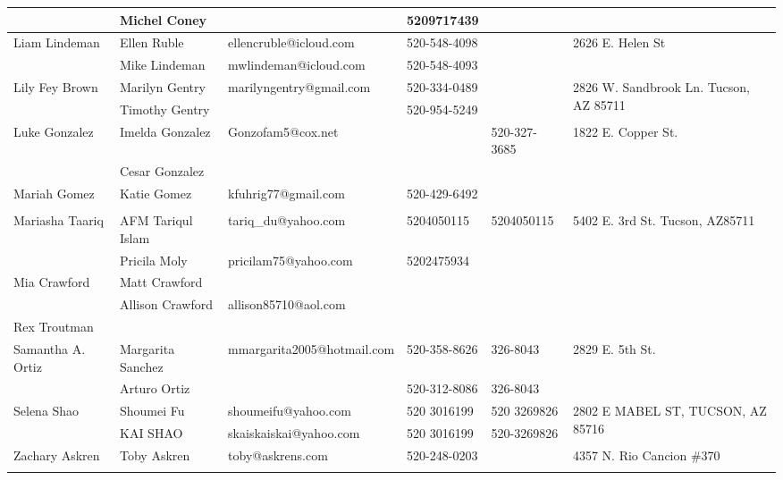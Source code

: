 \documentclass[landscape]{article}\usepackage[]{graphicx}\usepackage[]{color}
\begin{document}
\begin{longtable}{|p{100pt}|p{100pt}|p{140pt}|p{60pt}|p{64pt}|p{120pt}|}
 & Michel Coney &  & 5209717439 &  & \\
\hline
\multirow{2}{100pt}{Liam Lindeman} & Ellen Ruble & ellencruble@icloud.com & 520-548-4098 &  & \multirow{2}{120pt}{2626 E. Helen St} \\
 & Mike Lindeman & mwlindeman@icloud.com & 520-548-4093 &  & \\
\hline
\multirow{2}{100pt}{Lily Fey Brown} & Marilyn Gentry & marilyngentry@gmail.com & 520-334-0489 &  & \multirow{2}{120pt}{2826 W. Sandbrook Ln. Tucson, AZ 85711} \\
 & Timothy Gentry &  & 520-954-5249 &  & \\
\hline
\multirow{2}{100pt}{Luke Gonzalez} & Imelda Gonzalez  & Gonzofam5@cox.net &  & 520-327-3685 & \multirow{2}{120pt}{1822 E. Copper St.} \\
 & Cesar Gonzalez  &  &  &  & \\
\hline
\multirow{2}{100pt}{Mariah Gomez} & Katie Gomez & kfuhrig77@gmail.com & 520-429-6492 &  & \multirow{2}{120pt}{} \\
 &  &  &  &  & \\
\hline
\multirow{2}{100pt}{Mariasha Taariq} & AFM Tariqul Islam & tariq\_du@yahoo.com & 5204050115 & 5204050115 & \multirow{2}{120pt}{5402 E. 3rd St. Tucson, AZ85711} \\
 & Pricila Moly & pricilam75@yahoo.com & 5202475934 &  & \\
\hline
\multirow{2}{100pt}{Mia Crawford} & Matt Crawford &  &  &  & \multirow{2}{120pt}{} \\
 & Allison Crawford & allison85710@aol.com &  &  & \\
\hline
\multirow{2}{100pt}{Rex Troutman} &  &  &  &  & \multirow{2}{120pt}{} \\
 &  &  &  &  & \\
\hline
\multirow{2}{100pt}{Samantha A. Ortiz} & Margarita Sanchez & mmargarita2005@hotmail.com & 520-358-8626 & 326-8043 & \multirow{2}{120pt}{2829 E. 5th St.} \\
 & Arturo Ortiz &  & 520-312-8086 & 326-8043 & \\
\hline
\multirow{2}{100pt}{Selena Shao} & Shoumei Fu & shoumeifu@yahoo.com & 520 3016199 & 520 3269826 & \multirow{2}{120pt}{2802 E MABEL ST, TUCSON, AZ 85716} \\
 & KAI SHAO & skaiskaiskai@yahoo.com & 520 3016199 & 520-3269826 & \\
\hline
\multirow{2}{100pt}{Zachary Askren} & Toby Askren & toby@askrens.com & 520-248-0203 &  & \multirow{2}{120pt}{4357 N. Rio Cancion \#370} \\
 &  &  &  &  & \\
\hline
\end{longtable}
\newpage
\end{document}
